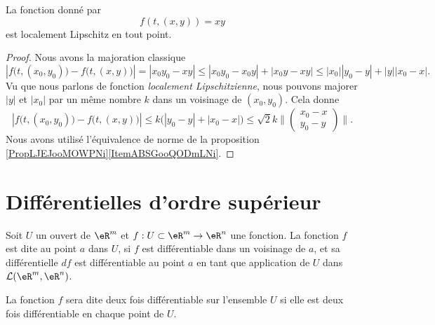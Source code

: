 \begin{lemma}   \label{LemCFZUooVqZmpc}
    La fonction donné par
    \begin{equation}
        f(t, (x,y) )=xy
    \end{equation}
    est localement Lipschitz en tout point.
\end{lemma}

\begin{proof}
    Nous avons la majoration classique
    \begin{equation}
        | f\big(t,(x_0,y_0)\big)-f\big( t,(x,y) \big) |=| x_0y_0-xy |\leq| x_0y_0-x_0y |+| x_0y-xy |\leq | x_0 || y_0-y |+| y || x_0-x |.
    \end{equation}
    Vu que nous parlons de fonction \emph{localement Lipschitzienne}, nous pouvons majorer \( | y |\) et \( | x_0 |\) par un même nombre \( k\) dans un voisinage de \( (x_0,y_0)\). Cela donne
    \begin{equation}
        | f\big(t,(x_0,y_0)\big)-f\big( t,(x,y) \big) |\leq k\big( | y_0-y |+| x_0-x | \big)\leq \sqrt{2}k\| \begin{pmatrix}
            x_0-x    \\ 
            y_0-y    
        \end{pmatrix}\|.
    \end{equation}
    Nous avons utilisé l'équivalence de norme de la proposition \ref{PropLJEJooMOWPNi}\ref{ItemABSGooQODmLNi}.
\end{proof}



\section{Différentielles d'ordre supérieur}		\label{SecDiffOrdSup}
\begin{definition}
	Soit $U$ un ouvert de $\eR^m$ et  $f:U\subset\eR^m\to \eR^n$ une fonction. La fonction $f$ est dite  au point $a$ dans $U$,  si $f$ est différentiable dans un voisinage de $a$, et sa différentielle $df$ est différentiable au point $a$ en tant que application de $U$ dans $\mathcal{L}(\eR^m, \eR^n)$.  

La fonction $f$ sera dite deux fois différentiable sur l'ensemble $U$ si elle est deux fois différentiable en chaque point de $U$.

\end{definition}

